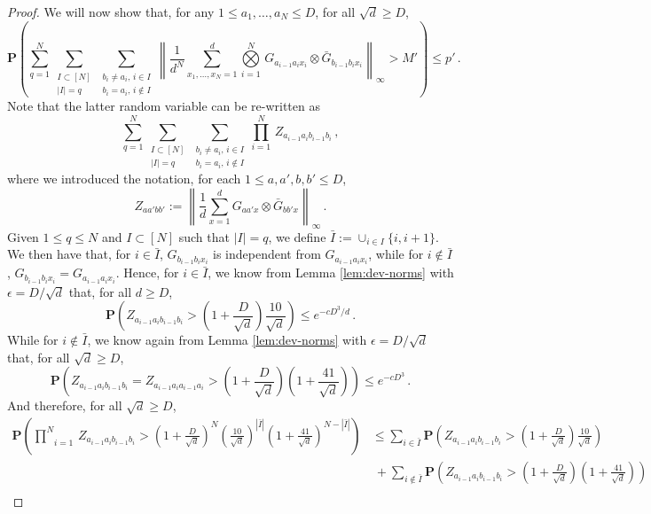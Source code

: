\documentclass{amsart}
\renewcommand{\P}{\mathbf{P}}
\renewcommand{\leq}{\leqslant}
\renewcommand{\geq}{\geqslant}
\begin{document}
\begin{proof}
    We will now show that, for any $1\leq a_1,\ldots,a_N\leq D$, for all $\sqrt{d}\geq D$,
    \begin{equation} \label{eq:dev2} \P\left( \sum_{q=1}^N \sum_{\substack{I\subset[N] \\ |I|=q}} \sum_{\substack{b_i\neq a_i,\,i\in I \\ b_i=a_i,\,i\notin I}} \left\| \frac{1}{d^N} \sum_{x_1,\ldots,x_N=1}^d \underset{i=1}{\overset{N}{\bigotimes}}\, G_{a_{i-1}a_ix_i} \otimes \bar{G}_{b_{i-1}b_ix_i} \right\|_{\infty} > M' \right) \leq p' \, . \end{equation}
    Note that the latter random variable can be re-written as
    \[ \sum_{q=1}^N \sum_{\substack{I\subset[N] \\ |I|=q}} \sum_{\substack{b_i\neq a_i,\,i\in I \\ b_i=a_i,\,i\notin I}} \underset{i=1}{\overset{N}{\prod}}\, Z_{a_{i-1}a_ib_{i-1}b_i} \, , \]
    where we introduced the notation, for each $1\leq a,a',b,b'\leq D$,
    \[ Z_{aa'bb'}:= \left\| \frac{1}{d}\sum_{x=1}^d G_{aa'x} \otimes \bar{G}_{bb'x} \right\|_{\infty} \, . \]
    Given $1\leq q\leq N$ and $I\subset[N]$ such that $|I|=q$, we define $\bar{I}:=\cup_{i\in I}\{i,i+1\}$. We then have that, for $i\in\bar{I}$, $G_{b_{i-1}b_ix_i}$ is independent from $G_{a_{i-1}a_ix_i}$, while for $i\notin\bar{I}$, $G_{b_{i-1}b_ix_i}=G_{a_{i-1}a_ix_i}$. Hence, for $i\in\bar{I}$, we know from Lemma \ref{lem:dev-norms} with $\epsilon=D/\sqrt{d}$ that, for all $d\geq D$,
    \[ \P\left( Z_{a_{i-1}a_ib_{i-1}b_i} > \left(1+\frac{D}{\sqrt{d}}\right) \frac{10}{\sqrt{d}} \right) \leq e^{-cD^3/d} \, . \]
    While for $i\notin\bar{I}$, we know again from Lemma \ref{lem:dev-norms} with $\epsilon=D/\sqrt{d}$ that, for all $\sqrt{d}\geq D$,
    \[ \P\left( Z_{a_{i-1}a_ib_{i-1}b_i} = Z_{a_{i-1}a_ia_{i-1}a_i}  > \left(1+\frac{D}{\sqrt{d}}\right) \left(1+\frac{41}{\sqrt{d}}\right) \right) \leq e^{-cD^3} \, . \]
    And therefore, for all $\sqrt{d}\geq D$,
    \begin{align*}
        \P\left( \underset{i=1}{\overset{N}{\prod}}\, Z_{a_{i-1}a_ib_{i-1}b_i} > \left(1+\frac{D}{\sqrt{d}}\right)^N \left(\frac{10}{\sqrt{d}}\right)^{|\bar{I}|} \left(1+\frac{41}{\sqrt{d}}\right)^{N-|\bar{I}|} \right) & \leq \sum_{i\in\bar{I}} \P\left(Z_{a_{i-1}a_ib_{i-1}b_i} > \left(1+\frac{D}{\sqrt{d}}\right) \frac{10}{\sqrt{d}} \right)                   \\
                                                                                                                                                                                                                           & \ + \sum_{i\notin\bar{I}} \P\left( Z_{a_{i-1}a_ib_{i-1}b_i} > \left(1+\frac{D}{\sqrt{d}}\right) \left(1+\frac{41}{\sqrt{d}}\right) \right) \\

\end{align*}
\end{proof}
\end{document}
